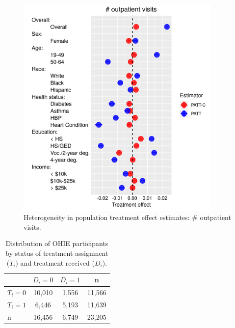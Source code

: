 \documentclass[hidelinks,12pt]{article}
\begin{document}
{\begin{appendices}
\begin{figure}[htbp]
	\begin{center}
		\includegraphics[width = 0.9\textwidth]{num-out-plot}
		\caption{Heterogeneity in population treatment effect estimates: $\#$ outpatient visits.\label{fig:num-out-plot}}
	\end{center}
\end{figure}

\begin{table}[h]
	\begin{center}
	\caption{Distribution of OHIE participants by status of treatment assignment ($T_i$) and treatment received ($D_i$).\label{ohie-status}} 
	\begin{tabular}{@{}lccc@{}}
		\toprule
		& $D_i = 0$ & $D_i = 1$ & n      \\ \midrule
		$T_i = 0$ & 10,010    & 1,556     & 11,566 \\
		$T_i = 1$ & 6,446     & 5,193     & 11,639 \\
		n         & 16,456    & 6,749     & 23,205 \\ \bottomrule
	\end{tabular}
	\end{center}
\end{table}


\end{appendices}}
\end{document}
